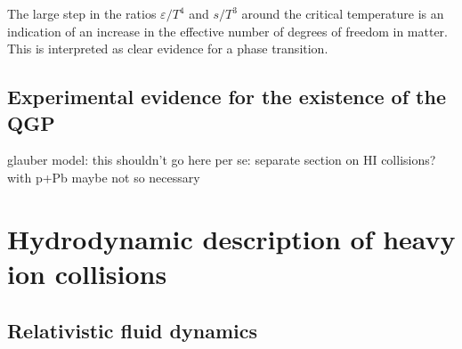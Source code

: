 The large step in the ratios $\varepsilon/T^4$ and $s/T^3$ around the critical temperature is an indication of an increase in the effective number of degrees of freedom in \qcd matter.
This is interpreted as clear evidence for a phase transition.

\subsection{Experimental evidence for the existence of the QGP}
glauber model: this shouldn't go here per se: \cite{Miller:2007ri} %
separate section on HI collisions? with p+Pb maybe not so necessary


\section{Hydrodynamic description of heavy ion collisions}

\subsection{Relativistic fluid dynamics}

